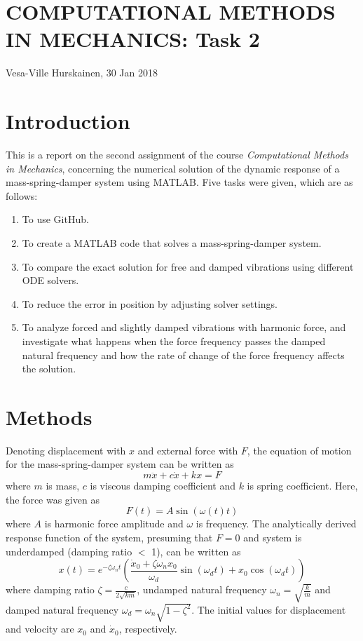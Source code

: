 \documentclass{article}
\begin{document}
	\section*{COMPUTATIONAL METHODS IN MECHANICS: Task 2}
	Vesa-Ville Hurskainen, 30 Jan 2018
	
	\section*{Introduction}
	This is a report on the second assignment of the course \textit{Computational Methods in Mechanics}, concerning the numerical solution of the dynamic response of a mass-spring-damper system using MATLAB. Five tasks were given, which are as follows:
	
	\begin{enumerate}
		\setlength\itemsep{0pt}
		\item To use GitHub.
		\item To create a MATLAB code that solves a mass-spring-damper system.
		\item To compare the exact solution for free and damped vibrations using different ODE solvers.
		\item To reduce the error in position by adjusting solver settings.
		\item To analyze forced and slightly damped vibrations with harmonic force, and investigate what happens when the force frequency passes the damped natural frequency and how the rate of change of the force frequency affects the solution.
	\end{enumerate}
	
	\section*{Methods}
	Denoting displacement with $x$ and external force with $F$, the equation of motion for the mass-spring-damper system can be written as
	\begin{equation}
		m \ddot{x} + c \dot{x} + k x  = F
	\end{equation}
	where $m$ is mass, $c$ is viscous damping coefficient and $k$ is spring coefficient. Here, the force was given as
	\begin{equation}
		F(t) = A \sin(\omega(t) t)
	\end{equation}
	where $A$ is harmonic force amplitude and $\omega$ is frequency. The analytically derived response function of the system, presuming that $F=0$ and system is underdamped (damping ratio $<$ 1), can be written as
	\begin{equation}
		x(t) = e^{-\zeta \omega_n t} \left(\frac{\dot{x}_0 + \zeta \omega_n x_0}{\omega_d} \sin(\omega_d t) + x_0 \cos(\omega_d t)\right)
	\end{equation}
	where damping ratio $\zeta = \frac{c}{2 \sqrt{km}}$, undamped natural frequency $\omega_n = \sqrt{\frac{k}{m}}$ and damped natural frequency $\omega_d = \omega_n \sqrt{1-\zeta^2}$. The initial values for displacement and velocity are $x_0$ and $\dot{x}_0$, respectively.
	
\end{document}
